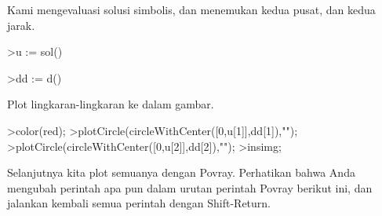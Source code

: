 \documentclass[12pt,arial,letterpaper]{book}
\begin{document}
\begin{eulernootebook}
\begin{eulercomment}
\begin{eulercomment}
\begin{eulernootebook}
\begin{eulercomment}
\begin{eulercomment}
\begin{eulercomment}
\begin{eulercomment}
\begin{eulercomment}
\begin{eulercomment}
\begin{eulernotebook}
\begin{eulercomment}
\begin{eulercomment}
\begin{eulercomment}
\begin{eulercomment}
\begin{eulercomment}
\begin{eulercomment}
\begin{eulercomment}
Kami mengevaluasi solusi simbolis, dan menemukan kedua pusat, dan
kedua jarak.
\end{eulercomment}
\begin{eulerprompt}
>u := sol()
\end{eulerprompt}
\begin{euleroutput}
  [0.333333,  1]
\end{euleroutput}
\begin{eulerprompt}
>dd := d()
\end{eulerprompt}
\begin{euleroutput}
  [0.149071,  0.447214]
\end{euleroutput}
\begin{eulercomment}
Plot lingkaran-lingkaran ke dalam gambar.
\end{eulercomment}
\begin{eulerprompt}
>color(red);
>plotCircle(circleWithCenter([0,u[1]],dd[1]),"");
>plotCircle(circleWithCenter([0,u[2]],dd[2]),"");
>insimg;
\end{eulerprompt}
\begin{eulercomment}
Selanjutnya kita plot semuanya dengan Povray. Perhatikan bahwa Anda
mengubah perintah apa pun dalam urutan perintah Povray berikut ini,
dan jalankan kembali semua perintah dengan Shift-Return.


\end{eulercomment}
\end{eulercomment}
\end{eulercomment}
\end{eulercomment}
\end{eulercomment}
\end{eulercomment}
\end{eulercomment}
\end{eulernotebook}
\end{eulercomment}
\end{eulercomment}
\end{eulercomment}
\end{eulercomment}
\end{eulercomment}
\end{eulercomment}
\end{eulernootebook}
\end{eulercomment}
\end{eulercomment}
\end{eulernootebook}
\end{document}
